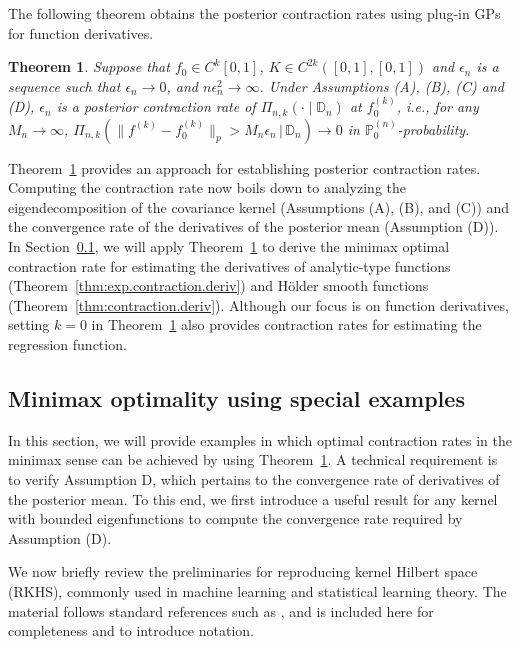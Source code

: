 \documentclass[12pt]{article}
\newcommand\data{\mathbb{D}_n}
\newcommand{\PP}{\mathbb{P}}
\theoremstyle{plain}
\newtheorem{theorem}{Theorem}
\theoremstyle{nonitalicremark}
\begin{document}
The following theorem obtains the posterior contraction rates using plug-in GPs for function derivatives. 



\begin{theorem}\label{thm:deriv.contraction.l2}
Suppose that $f_0 \in C^k[0,1]$, $K\in C^{2k}([0,1],[0,1])$ and $\epsilon_n$ is a sequence such that $\epsilon_n\rightarrow0$, and $n\epsilon_n^2\rightarrow\infty$. Under Assumptions (A), (B), (C) and (D), $\epsilon_n$ is a posterior contraction rate of $\Pi_{n,k}(\cdot \mid \data)$ at $f_0^{(k)}$, i.e., for any $M_n\rightarrow\infty$, $\Pi_{n,k}\left(\|f^{(k)}-f_0^{(k)}\|_p > M_n\epsilon_n\,\big|\,\data\right)\rightarrow 0$ in $\PP_0^{(n)}$-probability.
\end{theorem}

Theorem~\ref{thm:deriv.contraction.l2} provides an approach for establishing posterior contraction rates. Computing the contraction rate now boils down to analyzing the eigendecomposition of the  covariance kernel (Assumptions (A), (B), and (C)) and the convergence rate of the derivatives of the posterior mean (Assumption (D)). In Section~\ref{sec:Matern}, we will apply Theorem~\ref{thm:deriv.contraction.l2} to derive the minimax optimal contraction rate for estimating the derivatives of analytic-type functions (Theorem~\ref{thm:exp.contraction.deriv}) and H\"older smooth functions (Theorem~\ref{thm:contraction.deriv}). Although our focus is on function derivatives, setting $k = 0$ in Theorem~\ref{thm:deriv.contraction.l2} also provides contraction rates for estimating the regression function.




\subsection{Minimax optimality using special examples}\label{sec:Matern}


In this section, we will provide examples in which optimal contraction rates in the minimax sense can be achieved by using Theorem~\ref{thm:deriv.contraction.l2}. A technical requirement is to verify Assumption D, which pertains to
the convergence rate of derivatives of the posterior mean. To this end, we first introduce a useful result for any kernel with bounded eigenfunctions to compute the convergence rate required by Assumption (D). 

We now briefly review the preliminaries for reproducing kernel Hilbert space (RKHS), commonly used in machine learning and statistical learning theory. The material follows standard references such as \cite{rasmussen2006,berlinet2011reproducing}, and is included here for completeness and to introduce notation.
\end{document}
